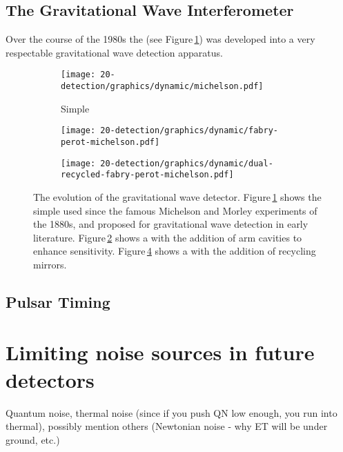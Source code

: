 
\subsection{The Gravitational Wave Interferometer}
Over the course of the 1980s the \MI (see Figure\,\ref{fig:mi}) was developed into a very respectable gravitational wave detection apparatus.

\begin{figure}
  \begin{center}
    \begin{subfigure}{.3\textwidth}
      \texttt{[image: 20-detection/graphics/dynamic/michelson.pdf]}
      \caption{Simple \MI}
      \label{fig:mi}
    \end{subfigure}
    \hfill
    \begin{subfigure}{.3\textwidth}
      \texttt{[image: 20-detection/graphics/dynamic/fabry-perot-michelson.pdf]}
      \caption{\FPMI}
      \label{fig:fpmi}
    \end{subfigure}
    \hfill
    \begin{subfigure}{.3\textwidth}
      \texttt{[image: 20-detection/graphics/dynamic/dual-recycled-fabry-perot-michelson.pdf]}
      \caption{\DRFPMI}
      \label{fig:drfpmi}
    \end{subfigure}
    \caption[The evolution of the gravitational wave detector]{The evolution of the gravitational wave detector. Figure\,\ref{fig:mi} shows the simple \MI used since the famous Michelson and Morley experiments of the 1880s, and proposed for gravitational wave detection in early literature. Figure\,\ref{fig:fpmi} shows a \MI with the addition of \FP arm cavities to enhance sensitivity. Figure\,\ref{fig:drfpmi} shows a \FPMI with the addition of recycling mirrors.}
  \end{center}
\end{figure}

\subsection{Pulsar Timing}

\section{Limiting noise sources in future detectors}
Quantum noise, thermal noise (since if you push QN low enough, you run into thermal), possibly mention others (Newtonian noise - why ET will be under ground, etc.)

